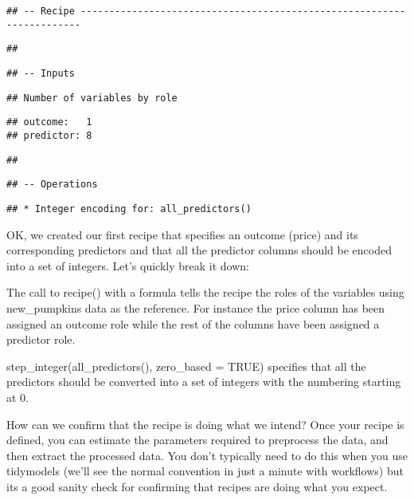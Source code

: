 \documentclass[
]{article}
\begin{document}
\begin{verbatim}
## -- Recipe ----------------------------------------------------------------------
\end{verbatim}

\begin{verbatim}
## 
\end{verbatim}

\begin{verbatim}
## -- Inputs
\end{verbatim}

\begin{verbatim}
## Number of variables by role
\end{verbatim}

\begin{verbatim}
## outcome:   1
## predictor: 8
\end{verbatim}

\begin{verbatim}
## 
\end{verbatim}

\begin{verbatim}
## -- Operations
\end{verbatim}

\begin{verbatim}
## * Integer encoding for: all_predictors()
\end{verbatim}

OK, we created our first recipe that specifies an outcome (price) and
its corresponding predictors and that all the predictor columns should
be encoded into a set of integers. Let's quickly break it down:

The call to recipe() with a formula tells the recipe the roles of the
variables using new\_pumpkins data as the reference. For instance the
price column has been assigned an outcome role while the rest of the
columns have been assigned a predictor role.

step\_integer(all\_predictors(), zero\_based = TRUE) specifies that all
the predictors should be converted into a set of integers with the
numbering starting at 0.

How can we confirm that the recipe is doing what we intend? Once your
recipe is defined, you can estimate the parameters required to
preprocess the data, and then extract the processed data. You don't
typically need to do this when you use tidymodels (we'll see the normal
convention in just a minute with workflows) but its a good sanity check
for confirming that recipes are doing what you expect.
\end{document}
